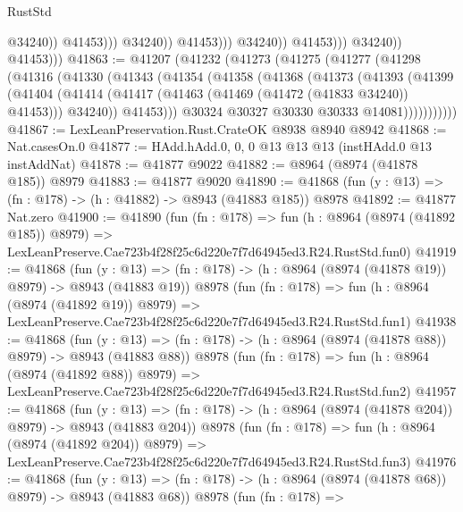 \begin{lexlean}{RustStd}
\begin{coremodule}
                                            @34240))
                                        @41453)))
                                  @34240))
                              @41453)))
                        @34240))
                    @41453)))
              @34240))
          @41453)))
@41863 := @41207
    (@41232
      (@41273
        (@41275
          (@41277
            (@41298
              (@41316
                (@41330
                  (@41343
                    (@41354
                      (@41358
                        (@41368
                          (@41373
                            (@41393
                              (@41399
                                (@41404
                                  (@41414
                                    (@41417 (@41463 (@41469 (@41472 (@41833 @34240)) @41453)))
                                    @34240))
                                @41453)))
                          @30324
                          @30327
                          @30330
                          @30333
                          @14081)))))))))))
@41867 := LexLeanPreservation.Rust.CrateOK @8938 @8940 @8942
@41868 := Nat.casesOn.{0}
@41877 := HAdd.hAdd.{0, 0, 0} @13 @13 @13 (instHAdd.{0} @13 instAddNat)
@41878 := @41877 @9022
@41882 := @8964 (@8974 (@41878 @185)) @8979
@41883 := @41877 @9020
@41890 := @41868 (fun (y : @13) => (fn : @178) -> (h : @41882) -> @8943 (@41883 @185)) @8978
@41892 := @41877 Nat.zero
@41900 := @41890
    (fun (fn : @178) =>
    fun (h : @8964 (@8974 (@41892 @185)) @8979) =>
    LexLeanPreserve.Cae723b4f28f25c6d220e7f7d64945ed3.R24.RustStd.fun0)
@41919 := @41868
    (fun (y : @13) => (fn : @178) -> (h : @8964 (@8974 (@41878 @19)) @8979) -> @8943 (@41883 @19))
    @8978
    (fun (fn : @178) =>
    fun (h : @8964 (@8974 (@41892 @19)) @8979) =>
    LexLeanPreserve.Cae723b4f28f25c6d220e7f7d64945ed3.R24.RustStd.fun1)
@41938 := @41868
    (fun (y : @13) => (fn : @178) -> (h : @8964 (@8974 (@41878 @88)) @8979) -> @8943 (@41883 @88))
    @8978
    (fun (fn : @178) =>
    fun (h : @8964 (@8974 (@41892 @88)) @8979) =>
    LexLeanPreserve.Cae723b4f28f25c6d220e7f7d64945ed3.R24.RustStd.fun2)
@41957 := @41868
    (fun (y : @13) => (fn : @178) -> (h : @8964 (@8974 (@41878 @204)) @8979) -> @8943 (@41883 @204))
    @8978
    (fun (fn : @178) =>
    fun (h : @8964 (@8974 (@41892 @204)) @8979) =>
    LexLeanPreserve.Cae723b4f28f25c6d220e7f7d64945ed3.R24.RustStd.fun3)
@41976 := @41868
    (fun (y : @13) => (fn : @178) -> (h : @8964 (@8974 (@41878 @68)) @8979) -> @8943 (@41883 @68))
    @8978
    (fun (fn : @178) =>

\end{coremodule}
\end{lexlean}
